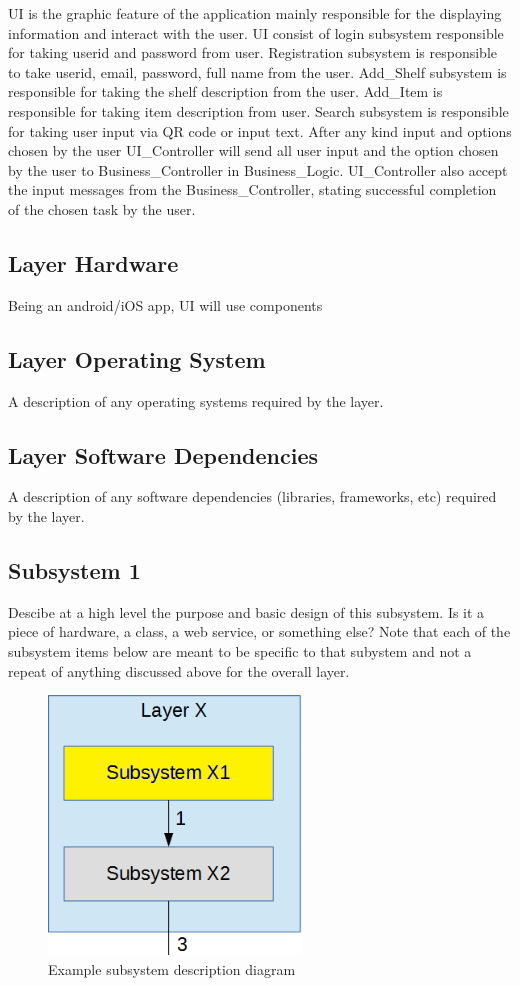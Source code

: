 UI is the graphic feature of the application mainly responsible for the displaying information and interact with the user. UI consist of login subsystem responsible for taking userid and password from user. Registration subsystem is responsible to take userid, email, password, full name from the user. Add\_Shelf subsystem is responsible for taking the shelf description from the user. Add\_Item is responsible for taking item description from user. Search subsystem is responsible for taking user input via QR code or input text. After any kind input and options chosen by the user UI\_Controller will send all user input and the option chosen by the user to Business\_Controller in Business\_Logic. UI\_Controller also accept the input messages from the Business\_Controller, stating successful completion of the chosen task by the user.

\subsection{Layer Hardware}
Being an android/iOS app, UI will use components 

\subsection{Layer Operating System}
A description of any operating systems required by the layer.

\subsection{Layer Software Dependencies}
A description of any software dependencies (libraries, frameworks, etc) required by the layer.

\subsection{Subsystem 1}
Descibe at a high level the purpose and basic design of this subsystem. Is it a piece of hardware, a class, a web service, or something else? Note that each of the subsystem items below are meant to be specific to that subystem and not a repeat of anything discussed above for the overall layer.

\begin{figure}[h!]
	\centering
 	\includegraphics[width=0.60\textwidth]{images/subsystem}
 \caption{Example subsystem description diagram}
\end{figure}

